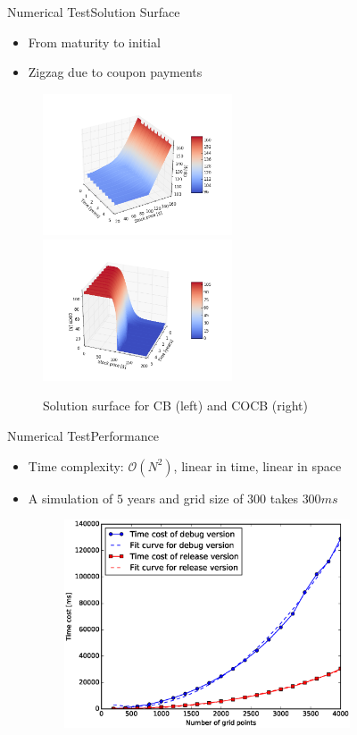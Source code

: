 \documentclass{beamer}
\begin{document}
\begin{frame}{Numerical Test}{Solution Surface}
	\begin{itemize}
		\item From maturity to initial
		\item Zigzag due to coupon payments
	\end{itemize}
	\begin{figure}
		\includegraphics[width=0.5\textwidth]{Figures/CBsurf}
		\includegraphics[width=0.5\textwidth]{Figures/COCBsurf}
		\caption{Solution surface for CB (left) and COCB (right)}
		\label{fig:surf}
	\end{figure}
\end{frame}

\begin{frame}{Numerical Test}{Performance}
\begin{itemize}
	\item Time complexity: $\mathcal{O}(N^2)$, linear in time, linear in space
	\item A simulation of $5$ years and grid size of $300$ takes $300 ms$ 
	\begin{figure}
	\centering
	\includegraphics[width=0.8\textwidth]{Figures/timecost}
	\end{figure}
\end{itemize}
\end{frame}
\end{document}
